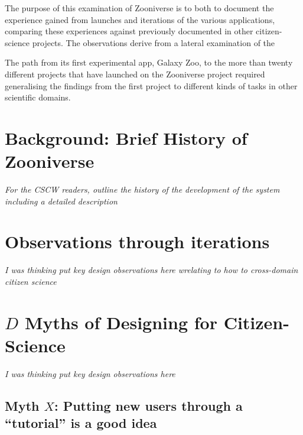 \documentclass{sigchi}
\begin{document}
The purpose of this examination of Zooniverse is to both to document
the experience gained from launches and iterations of the various
applications, comparing these experiences against previously
documented in other citizen-science projects.  The observations derive
from a lateral examination of the

The path from its first experimental app, Galaxy Zoo, to the more than
twenty different projects that have launched on the Zooniverse project
required generalising the findings from the first project to different
kinds of tasks in other scientific domains.




\section{Background: Brief History of Zooniverse}

\emph{For the CSCW readers, outline the history of the development of the system
including a detailed description}

\section{Observations through iterations}

\emph{I was thinking put key design observations here wrelating to how to cross-domain
citizen science}

\section{$D$ Myths of Designing for Citizen-Science}

\emph{I was thinking put key design observations here}

\subsection{Myth $X$: Putting new users through a ``tutorial'' is a good idea}
\end{document}
